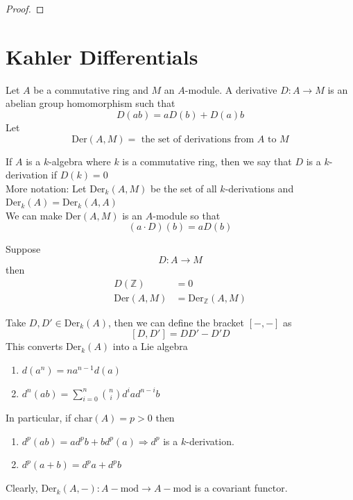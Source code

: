 \documentclass[oneside, 12pt, ]{scrbook}
\newcommand{\ZZ}{\mathbb Z}
\theoremstyle{theorem}
\begin{document}
\begin{proof}

\end{proof}

\section{Kahler Differentials}

Let $A$ be a commutative ring and $M$ an $A$-module. A derivative $D : A \rightarrow M$ is an abelian group homomorphism such that $$D(ab) = aD(b) + D(a)b$$
Let $$\mathrm{Der}(A,M) = \text{ the set of derivations from } A \text{ to } M$$

If $A$ is a $k$-algebra where $k$ is a commutative ring, then we say that $D$ is a $k$-derivation if $D(k)=0$ \\

More notation: Let $\mathrm{Der}_{k}(A,M)$ be the set of all $k$-derivations and $\mathrm{Der}_{k}(A) = \mathrm{Der}_{k}(A,A)$\\

We can make $\mathrm{Der}(A,M)$ is an $A$-module so that $$(a\cdot D)(b) = aD(b)$$

Suppose $$D: A \rightarrow M$$ then 
\begin{align*}
D(\ZZ) &= 0 \\
\mathrm{Der}(A,M) &= \mathrm{Der}_{\ZZ}(A,M)
\end{align*}

Take $D,D' \in \mathrm{Der}_{k}(A)$, then we can define the bracket $[-,-]$ as $$[D,D'] = DD' - D'D$$ This converts $\mathrm{Der}_{k}(A)$ into a Lie algebra 

\begin{remark}
\begin{enumerate}
\item $d(a^n) = na^{n-1}d(a)$
\item $d^{n}(ab) = \sum_{i=0}^{n} \binom{n}{i} d^{i} a d^{n-i} b$
\end{enumerate}
In particular, if $\mathrm{char}(A)=p > 0$ then 
\begin{enumerate}
\item $d^{p}(ab) = ad^{p}b + bd^{p}(a) \Rightarrow d^p$ is a $k$-derivation.
\item $d^{p}(a+b) = d^p a + d^p b$ 
\end{enumerate}
\end{remark}

Clearly, $\mathrm{Der}_{k}(A, -): A-\mathrm{mod} \rightarrow A-\mathrm{mod}$ is a covariant functor.
\end{document}
